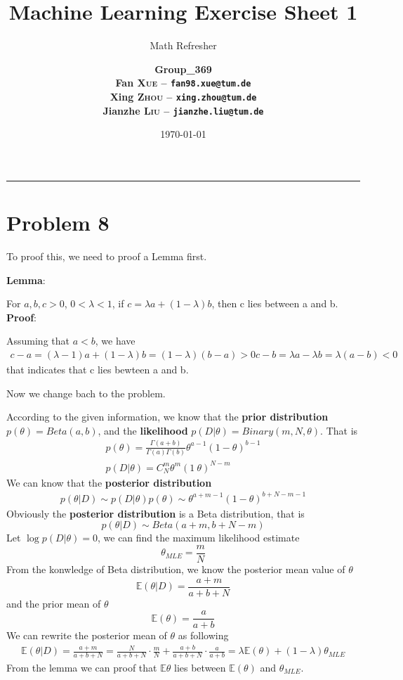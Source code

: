\documentclass[12pt]{scrartcl}
\title{\large Machine Learning Exercise Sheet 1}
\subtitle{\Large Math Refresher}
\author{\large\bfseries Group\_369 \\
        \large Fan \textsc{Xue} -- \texttt{fan98.xue@tum.de} \\
        \large Xing \textsc{Zhou} -- \texttt{xing.zhou@tum.de} \\
        \large Jianzhe \textsc{Liu} -- \texttt{jianzhe.liu@tum.de}}
\date{\large \today}
\newcommand\E{\mathbb{E}}
\begin{document}
  \maketitle
  \vspace{-1cm}
  \noindent\rule{\textwidth}{0.4pt}

  \section*{Problem 8}
  To proof this, we need to proof a Lemma first.

  \textbf{Lemma}:

  \quad For $ a, b, c > 0 $, $0 < \lambda < 1 $, if $ c = \lambda a + (1 - \lambda) b $, then c lies between a and b. \\
  \textbf{Proof}: 

  Assuming that $a < b$, we have
  \[
    \begin{split}
      c - a = (\lambda - 1)a + (1 - \lambda)b = (1 - \lambda)(b - a) > 0
      c - b = \lambda a - \lambda b = \lambda (a - b) < 0
    \end{split}
  \]
  that indicates that c lies bewteen a and b.

  Now we change bach to the problem.

  According to the given information, we know that the \textbf{prior distribution} \(p(\theta) = Beta(a, b)\), and the \textbf{likelihood} \(p(D|\theta) = Binary(m, N, \theta)\). That is
  \[
    \begin{split}
      p(\theta) = \frac{\Gamma(a + b)}{\Gamma(a)\Gamma(b)}\theta^{a - 1}(1 - \theta)^{b - 1}  \\
      p(D|\theta) = C_N^m\theta^m(1 \ \theta)^{N - m}
    \end{split}  
  \]
  We can know that the \textbf{posterior distribution}
  \[
    \begin{split}
      p(\theta|D) \sim p(D|\theta)p(\theta) \sim \theta^{a + m - 1}(1 - \theta)^{b + N - m - 1}
    \end{split}
  \]
  Obviously the \textbf{posterior distribution} is a Beta distribution, that is
  \[
    p(\theta|D) \sim Beta(a+m, b+N-m)
  \]
  Let \(\log p(D|\theta) = 0\), we can find the maximum likelihood estimate
  \[
    \theta_{MLE} = \frac{m}{N}
  \]
  From the konwledge of Beta distribution, we know the posterior mean value of \(\theta\)
  \[
    \E(\theta|D) = \frac{a+m}{a + b + N}
  \] 
  and the prior mean of \(\theta\)
  \[
    \E(\theta) = \frac{a}{a + b}
  \]
  We can rewrite the posterior mean of \(\theta\) as following
  \[
    \begin{split}
      \E(\theta|D) = \frac{a+m}{a + b + N} = \frac{N}{a+b+N} \cdot \frac{m}{N} + \frac{a+b}{a+b+N} \cdot \frac{a}{a + b}
      = \lambda \E(\theta) + (1-\lambda)\theta_{MLE}
    \end{split}
  \]
  From the lemma we can proof that $\E{\theta}$ lies between $\E(\theta)$ and $\theta_{MLE}$.
  
 
\end{document}
